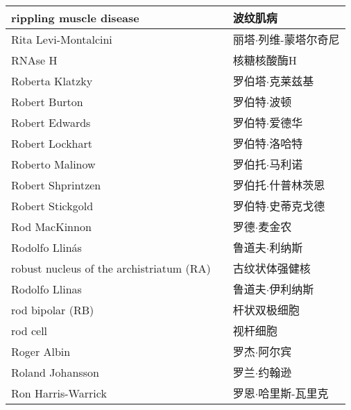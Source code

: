 \begin{longtable}{lll}
	\midrule
	rippling muscle disease   && 波纹肌病  \\
	
	\midrule
	Rita Levi-Montalcini   && 丽塔$\cdot$列维-蒙塔尔奇尼  \\
	
	\midrule
	RNAse H   && 核糖核酸酶H  \\
	
	\midrule
	Roberta Klatzky   && 罗伯塔$\cdot$克莱兹基  \\
	
	\midrule
	Robert Burton   && 罗伯特$\cdot$波顿  \\
	
	\midrule
	Robert Edwards   && 罗伯特$\cdot$爱德华  \\
	
	\midrule
	Robert Lockhart   && 罗伯特$\cdot$洛哈特  \\
	
	\midrule
	Roberto Malinow   && 罗伯托$\cdot$马利诺  \\
	
	\midrule
	Robert Shprintzen   && 罗伯托$\cdot$什普林茨恩  \\
	
	\midrule
	Robert Stickgold   && 罗伯特$\cdot$史蒂克戈德  \\
	
	\midrule
	Rod MacKinnon   && 罗德$\cdot$麦金农  \\
	
	\midrule
	Rodolfo Llinás   && 鲁道夫$\cdot$利纳斯  \\
	
	\midrule
	robust nucleus of the archistriatum (RA)   && 古纹状体强健核  \\
	
	\midrule
	Rodolfo Llinas   && 鲁道夫$\cdot$伊利纳斯  \\
	
	\midrule
	rod bipolar (RB)  && 杆状双极细胞  \\
	
	\midrule
	rod cell   && 视杆细胞  \\
	
	\midrule
	Roger Albin   && 罗杰$\cdot$阿尔宾  \\
	
	\midrule
	Roland Johansson   && 罗兰$\cdot$约翰逊  \\
	
	\midrule
	Ron Harris-Warrick   && 罗恩$\cdot$哈里斯-瓦里克  \\
	

\end{longtable}
